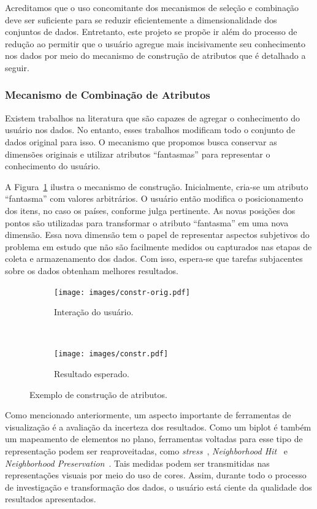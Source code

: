 Acreditamos que o uso concomitante dos mecanismos de seleção
e combinação deve ser suficiente para se reduzir
eficientemente a dimensionalidade dos conjuntos de dados.
Entretanto, este projeto se propõe ir além do processo de
redução ao permitir que o usuário agregue mais incisivamente
seu conhecimento nos dados por meio do mecanismo de
construção de atributos que é detalhado a seguir.

\subsubsection{Mecanismo de Combinação de Atributos}

Existem trabalhos na literatura que são capazes de agregar
o conhecimento do usuário nos dados. No entanto, esses
trabalhos modificam todo o conjunto de dados original para
isso. O mecanismo que propomos busca conservar as dimensões
originais e utilizar atributos ``fantasmas'' para
representar o conhecimento do usuário.

A Figura~\ref{fig:constr} ilustra o mecanismo de construção.
Inicialmente, cria-se um atributo ``fantasma'' com valores
arbitrários. O usuário então modifica o posicionamento dos
itens, no caso os países, conforme julga pertinente. As
novas posições dos pontos são utilizadas para transformar o
atributo ``fantasma'' em uma nova dimensão. Essa nova
dimensão tem o papel de representar aspectos subjetivos do
problema em estudo que não são facilmente medidos ou
capturados nas etapas de coleta e armazenamento dos dados.
Com isso, espera-se que tarefas subjacentes sobre os dados
obtenham melhores resultados. 

\begin{figure}[h!]
  \centering
  \begin{subfigure}[b]{0.45\textwidth}
    \centering
    \texttt{[image: images/constr-orig.pdf]}
    \caption{Interação do usuário.}
  \end{subfigure}%
  ~
  \begin{subfigure}[b]{0.45\textwidth}
    \centering
    \texttt{[image: images/constr.pdf]}
    \caption{Resultado esperado.}
  \end{subfigure} 
  \caption{Exemplo de construção de atributos.}
  \label{fig:constr}
\end{figure}

Como mencionado anteriormente, um aspecto importante de
ferramentas de visualização é a avaliação da incerteza dos
resultados. Como um biplot é também um mapeamento de
elementos no plano, ferramentas voltadas para esse tipo de
representação podem ser reaproveitadas, como
\emph{stress}~\cite{Kruskal1964}, \emph{Neighborhood
Hit}~\cite{Paulovich2008} e \emph{Neighborhood
Preservation}~\cite{Paulovich2008a}. Tais medidas
podem ser transmitidas nas representações visuais por meio
do uso de cores. Assim, durante todo o processo de
investigação e transformação dos dados, o usuário está
ciente da qualidade dos resultados apresentados. 

